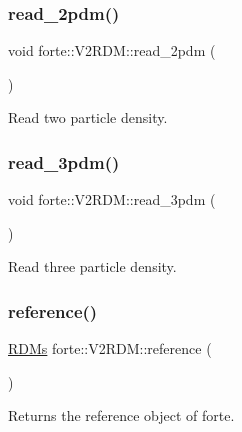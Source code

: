 \subsubsection{\texorpdfstring{read\+\_\+2pdm()}{read\_2pdm()}}
{\footnotesize\ttfamily void forte\+::\+V2\+R\+D\+M\+::read\+\_\+2pdm (\begin{DoxyParamCaption}{ }\end{DoxyParamCaption})\hspace{0.3cm}{\ttfamily [protected]}}



Read two particle density. 

\mbox{\label{classforte_1_1_v2_r_d_m_a5689f0ed416de34110ff6db161d00eac}} 
\subsubsection{\texorpdfstring{read\+\_\+3pdm()}{read\_3pdm()}}
{\footnotesize\ttfamily void forte\+::\+V2\+R\+D\+M\+::read\+\_\+3pdm (\begin{DoxyParamCaption}{ }\end{DoxyParamCaption})\hspace{0.3cm}{\ttfamily [protected]}}



Read three particle density. 

\mbox{\label{classforte_1_1_v2_r_d_m_afc67a5f2ac9d4d612fd11d0e1ebb036c}} 
\subsubsection{\texorpdfstring{reference()}{reference()}}
{\footnotesize\ttfamily \mbox{\hyperlink{classforte_1_1_r_d_ms}{R\+D\+Ms}} forte\+::\+V2\+R\+D\+M\+::reference (\begin{DoxyParamCaption}{ }\end{DoxyParamCaption})}



Returns the reference object of forte. 

\mbox{\label{classforte_1_1_v2_r_d_m_ad6fcf6910a6b1534417029d000818ba0}} 
